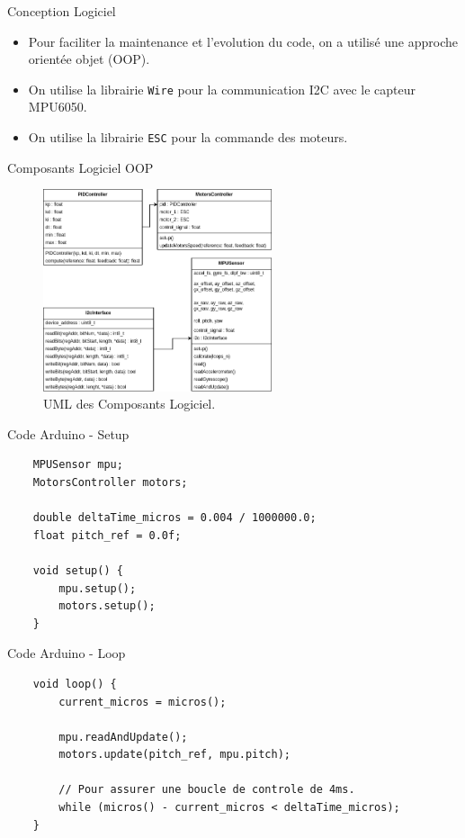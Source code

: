 \documentclass{beamer}
\begin{document}
\begin{frame}{Conception Logiciel}
	\begin{itemize}
		\item Pour faciliter la maintenance et l'evolution du code, on a utilisé une approche orientée objet (OOP).
		\item On utilise la librairie \texttt{Wire} pour la communication I2C avec le capteur MPU6050.
		\item On utilise la librairie \texttt{ESC} pour la commande des moteurs.
	\end{itemize}
\end{frame}

\begin{frame}[plain]{Composants Logiciel OOP}
	\begin{figure}
		\centering
		\includegraphics[width=0.6\textwidth]{assets/uml-oop.png}
		\caption{UML des Composants Logiciel.}
	\end{figure}
\end{frame}


\begin{frame}[fragile]{Code Arduino - Setup}
	\begin{verbatim}
	MPUSensor mpu;
	MotorsController motors;

	double deltaTime_micros = 0.004 / 1000000.0;
	float pitch_ref = 0.0f;

	void setup() {
		mpu.setup();
		motors.setup();
	}
	\end{verbatim}
\end{frame}

\begin{frame}[fragile]{Code Arduino - Loop}
	\begin{verbatim}
	void loop() {
		current_micros = micros();

		mpu.readAndUpdate();
		motors.update(pitch_ref, mpu.pitch);

		// Pour assurer une boucle de controle de 4ms.
		while (micros() - current_micros < deltaTime_micros);
	}
	\end{verbatim}
\end{frame}
\end{document}
